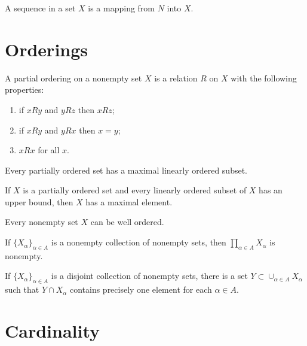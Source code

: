 A sequence in a set $X$ is a mapping from $N$ into $X$.

\section{Orderings}

\begin{definition}
A partial ordering on a nonempty set $X$ is a relation $R$ on $X$ with the following properties:
\begin{enumerate}
    \item if $x R y$ and $y R z$ then $x R z$;
    \item if $x R y$ and $y R x$ then $x = y$;
    \item $x R x$ for all $x$.
\end{enumerate}
\end{definition}

\begin{theorem}
Every partially ordered set has a maximal linearly ordered subset.
\end{theorem}

\begin{lemma}
If $X$ is a partially ordered set and every linearly ordered subset of $X$ has an upper bound, then $X$ has a maximal element.
\end{lemma}

\begin{theorem}
Every nonempty set $X$ can be well ordered.
\end{theorem}

\begin{theorem}
If $\{ X_{\alpha} \}_{\alpha \in A}$ is a nonempty collection of nonempty sets, then $\prod_{\alpha \in A} X_{\alpha}$ is nonempty.
\end{theorem}

\begin{corollary}
If $\{ X_{\alpha} \}_{\alpha \in A}$ is a disjoint collection of nonempty sets, there is a set $Y \subset \cup_{\alpha \in A} X_{\alpha}$ such that $Y \cap X_{\alpha}$ contains precisely one element for each $\alpha \in A$.
\end{corollary}

\section{Cardinality}

